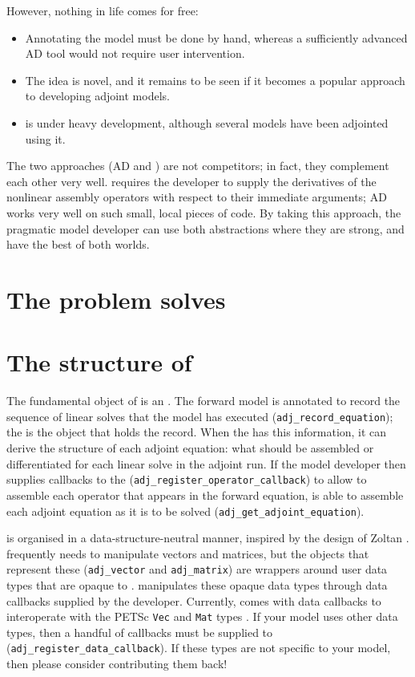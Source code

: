 However, nothing in life comes for free:
\begin{itemize}
\item Annotating the model must be done by hand, whereas a sufficiently advanced
AD tool would not require user intervention.
\item The idea is novel, and it remains to be seen if it becomes a popular approach
to developing adjoint models.
\item \libadjoint is under heavy development, although several models have been adjointed
using it.
\end{itemize}

The two approaches (AD and \libadjoint) are not competitors; in fact, they complement each
other very well. \libadjoint requires
the developer to supply the derivatives of the nonlinear assembly operators with respect to
their immediate arguments; AD works very well on such small, local pieces of code. By taking
this approach, the pragmatic model developer can use both abstractions where they are strong,
and have the best of both worlds.

\section{The problem \libadjoint solves}

\section{The structure of \libadjoint}
The fundamental object of \libadjoint is an \adjointer. The forward model is annotated
to record the sequence of linear solves that the model has executed (\texttt{adj_record_equation}); the \adjointer is
the object that holds the record. When the \adjointer has this information, it can derive
the structure of each adjoint equation: what should be assembled or differentiated for each linear
solve in the adjoint run. If the model developer then
supplies callbacks to the \adjointer (\texttt{adj_register_operator_callback}) to allow \libadjoint to assemble each
operator that appears in the forward equation, \libadjoint is
able to assemble each adjoint equation as it is to be solved (\texttt{adj_get_adjoint_equation}).

\libadjoint is organised in a data-structure-neutral manner, inspired by the design
of Zoltan \citep{devine2002}. \libadjoint frequently needs to manipulate vectors
and matrices, but the objects that represent these (\texttt{adj_vector} and \texttt{adj_matrix})
are wrappers around user data types that are opaque to \libadjoint. \libadjoint manipulates
these opaque data types through data callbacks supplied by the developer. Currently, \libadjoint
comes with data callbacks to interoperate with the PETSc \texttt{Vec} and \texttt{Mat} types \citep{balay2010}.
If your model uses other data types, then a handful of callbacks must be supplied to \libadjoint (\texttt{adj_register_data_callback}).
If these types are not specific to your model, then please consider contributing them back!

